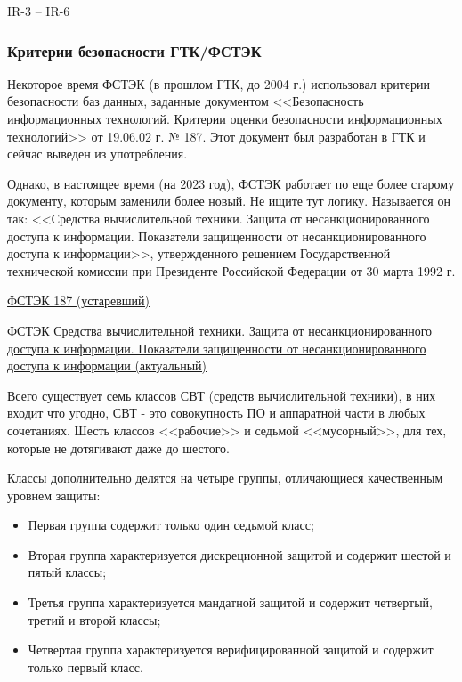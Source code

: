 \cite{PurpleBook} IR-3 -- IR-6

\subsubsection{Критерии безопасности ГТК/ФСТЭК}

Некоторое время ФСТЭК (в прошлом ГТК, до 2004 г.) использовал критерии безопасности баз данных, заданные документом <<Безопасность информационных технологий. Критерии оценки безопасности информационных технологий>> от 19.06.02 г. № 187. Этот документ был разработан в ГТК и сейчас выведен из употребления. \cite{GTKFSTEK}

Однако, в настоящее время (на 2023 год), ФСТЭК работает по еще более старому документу, которым заменили более новый. Не ищите тут логику. Называется он так:
<<Средства вычислительной техники. Защита от несанкционированного доступа к информации. Показатели защищенности от несанкционированного доступа к информации>>, утвержденного решением Государственной технической комиссии при Президенте Российской Федерации от 30 марта 1992 г.

\href{https://fstec.ru/component/attachments/download/293}{ФСТЭК 187 (устаревший)}

\href{https://fstec.ru/component/attachments/download/296}{ФСТЭК Средства вычислительной техники. Защита от несанкционированного доступа к информации. Показатели защищенности от несанкционированного доступа к информации (актуальный)}

Всего существует семь классов СВТ (средств вычислительной техники), в них входит что угодно, СВТ - это совокупность ПО и аппаратной части в любых сочетаниях. Шесть классов <<рабочие>> и седьмой <<мусорный>>, для тех, которые не дотягивают даже до шестого.

Классы дополнительно делятся на четыре группы, отличающиеся качественным уровнем защиты:
\begin{itemize}
	\item Первая группа содержит только один седьмой класс;
	\item Вторая группа характеризуется дискреционной защитой и содержит шестой и пятый классы;
	\item Третья группа характеризуется мандатной защитой и содержит четвертый, третий и второй классы;
	\item Четвертая группа характеризуется верифицированной защитой и содержит только первый класс.
\end{itemize}

